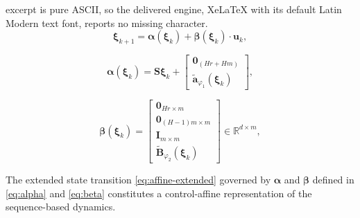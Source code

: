 \documentclass[10pt,a4paper]{amsart}
\begin{document}
excerpt is pure ASCII, so the delivered engine, XeLaTeX with its default Latin Modern text font, reports no missing character.
\begin{equation}
    \label{eq:affine-extended}
    \boldsymbol{\xi}_{k+1} = \boldsymbol{\alpha}(\boldsymbol{\xi}_k) + \boldsymbol{\beta}(\boldsymbol{\xi}_k)\cdot\mathbf{u}_k,
\end{equation}

\begin{equation}
\label{eq:alpha}
\boldsymbol{\alpha}(\boldsymbol{\xi}_k) = \mathbf{S} \boldsymbol{\xi}_k + \begin{bmatrix} \mathbf{0}_{(H r + H m)} \\ \widetilde{\mathbf{a}}_{\varphi_1}(\boldsymbol{\xi}_k) \end{bmatrix},
\end{equation}

\begin{equation}
\label{eq:beta}
\boldsymbol{\beta}(\boldsymbol{\xi}_k) =
\begin{bmatrix}
\mathbf{0}_{Hr \times m} \\
\mathbf{0}_{(H-1)m \times m} \\
\mathbf{I}_{m \times m} \\
\widetilde{\mathbf{B}}_{\varphi_2}(\boldsymbol{\xi}_k)
\end{bmatrix} \in \mathbb{R}^{d \times m},
\end{equation}

\begin{proposition}
The extended state transition \eqref{eq:affine-extended} governed by $\boldsymbol{\alpha}$ and $\boldsymbol{\beta}$ defined in \eqref{eq:alpha} and \eqref{eq:beta} constitutes a control-affine representation of the sequence-based dynamics.
\end{proposition}
\end{document}
